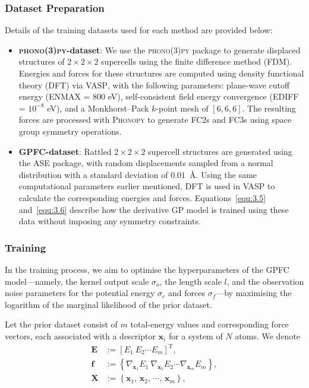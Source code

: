 \subsubsection{Dataset Preparation}
Details of the training datasets used for each method are provided below:
\begin{itemize}
    \item \textbf{\textsc{phono(3)py}-dataset}: We use the \textsc{phono(3)py} package to generate displaced structures of $2 \times 2 \times 2$ supercells using the finite difference method (FDM). Energies and forces for these structures are computed using density functional theory (DFT) via \textsc{VASP}, with the following parameters: plane-wave cutoff energy (\textsc{ENMAX} = 800 eV), self-consistent field energy convergence (\textsc{EDIFF} = $10^{-8}$ eV), and a Monkhorst–Pack $k$-point mesh of $[6, 6, 6]$. The resulting forces are processed with \textsc{Phonopy} to generate FC2s and FC3s using space group symmetry operations.
    \item \textbf{\textsc{GPFC}-dataset}: Rattled $2 \times 2 \times 2$ supercell structures are generated using the \textsc{ASE} package, with random displacements sampled from a normal distribution with a standard deviation of $0.01$~\AA. Using the same computational parameters earlier mentioned, DFT is used in \textsc{VASP} to calculate the corresponding energies and forces.  Equations~\eqref{equ:3.5} and~\eqref{equ:3.6} describe how the derivative GP model is trained using these data without imposing any symmetry constraints.
\end{itemize}
\subsubsection{Training}
In the training process, we aim to optimise the hyperparameters of the GPFC model—namely, the kernel output scale $\sigma_{o}$, the length scale $l$, and the observation noise parameters for the potential energy $\sigma_{e}$ and forces $\sigma_{f}$—by maximising the logarithm of the marginal likelihood of the prior dataset.

Let the prior dataset consist of $m$ total-energy values and corresponding force vectors, each associated with a descriptor $\mathbf{x}_i$ for a system of $N$ atoms. We denote
\begin{subequations}
\begin{align} 
   \label{equ:3.10a} 
   \mathbf{E} &:= \left[E_{1}\:E_{2}\cdots E_{m} \right]^{\text{T}},\\
   \label{equ:3.10b} 
   \mathbf{f} &:= \left\{\nabla_{\mathbf{x}_{1}} E_{1}\:\nabla_{\mathbf{x}_{2}} E_{2}\cdots \nabla_{\mathbf{x}_{m}} E_{m} \right\},\\
   \label{equ:3.10c} 
   \mathbf{X} &:= \left\{\mathbf{x}_{1},\, \mathbf{x}_{2},\, \cdots,\, \mathbf{x}_{m} \right\},
\end{align}
\end{subequations}

